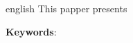 \documentclass[
	12pt,				%
	openright,			%
	oneside,			%
	a4paper,			%
	chapter=TITLE,		%
	english,			%
	french,				%
	spanish,			%
	brazil				%
	]{abntex2}
\begin{document}
\begin{resumo}[Abstract]
 \begin{otherlanguage*}{english}
    This papper presents

   \vspace{\onelineskip}

   \noindent
   \textbf{Keywords}:
 \end{otherlanguage*}
\end{resumo}


\listoffigures*
\cleardoublepage




\cleardoublepage

\tableofcontents*
\cleardoublepage

\textual


%


%

%
\end{document}
